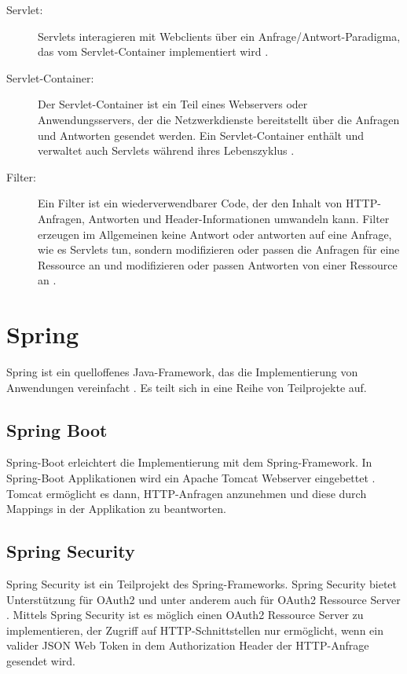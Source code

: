 \begin{description}
  \item[Servlet:] Servlets interagieren mit Webclients über ein Anfrage/Antwort-Paradigma, das vom Servlet-Container implementiert wird \citep{servlet:2020}.
  \item[Servlet-Container:] Der Servlet-Container ist ein Teil eines Webservers oder Anwendungsservers, der die Netzwerkdienste bereitstellt
  über die Anfragen und Antworten gesendet werden. Ein Servlet-Container enthält und verwaltet auch Servlets während ihres Lebenszyklus \citep{servlet:2020}.
  \item[Filter:] Ein Filter ist ein wiederverwendbarer Code, der den Inhalt von HTTP-Anfragen, Antworten und Header-Informationen umwandeln kann. Filter erzeugen im Allgemeinen keine Antwort oder antworten auf eine Anfrage, wie es Servlets tun, sondern modifizieren oder passen die Anfragen für eine Ressource an und modifizieren oder passen Antworten von einer Ressource an \citep{servlet:2020}.
\end{description}

\section{Spring}
Spring ist ein quelloffenes Java-Framework, das die Implementierung von Anwendungen 
vereinfacht \citep{spring:2021}. Es teilt sich in eine Reihe von Teilprojekte auf. 

\subsection{Spring Boot}
Spring-Boot erleichtert die Implementierung mit dem Spring-Framework. In Spring-Boot Applikationen wird ein Apache Tomcat Webserver eingebettet \citep{springboot:2021}. Tomcat ermöglicht es dann, HTTP-Anfragen anzunehmen und diese durch Mappings in der Applikation zu beantworten.

\subsection{Spring Security}
Spring Security ist ein Teilprojekt des Spring-Frameworks. Spring Security bietet 
Unterstützung für OAuth2 und unter anderem auch für OAuth2 Ressource Server \citep{springsecurity:2021}. 
Mittels Spring Security ist es möglich einen OAuth2 Ressource Server zu implementieren, der 
Zugriff auf HTTP-Schnittstellen nur ermöglicht, wenn ein valider JSON Web Token in dem 
Authorization Header der HTTP-Anfrage gesendet wird. 

